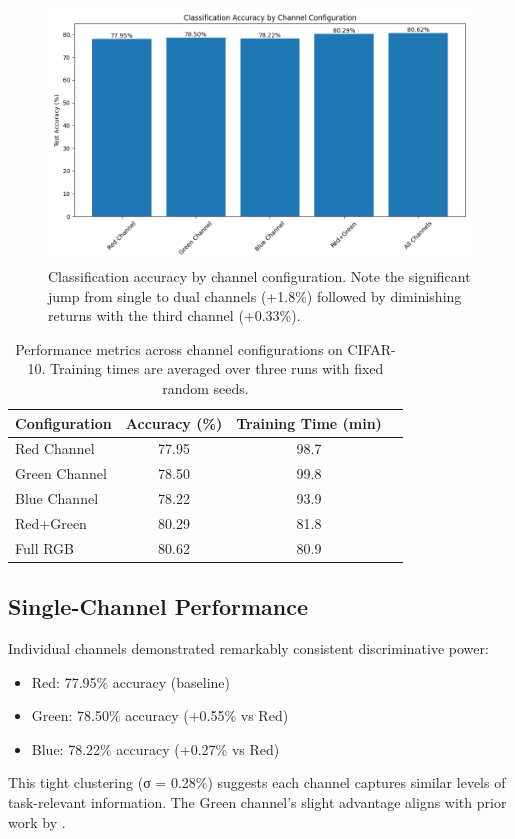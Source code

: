 \documentclass{article} %
\begin{document}
\begin{figure}[t]
    \centering
    \includegraphics[width=0.8\linewidth]{accuracy_comparison.png}
    \caption{Classification accuracy by channel configuration. Note the significant jump from single to dual channels (+1.8\%) followed by diminishing returns with the third channel (+0.33\%).}
    \label{fig:accuracy}
\end{figure}

\begin{table}[h]
    \centering
    \begin{tabular}{lccc}
        \toprule
        Configuration & Accuracy (\%) & Training Time (min) \\
        \midrule
        Red Channel & 77.95 & 98.7 \\
        Green Channel & 78.50 & 99.8 \\
        Blue Channel & 78.22 & 93.9 \\
        Red+Green & 80.29 & 81.8 \\
        Full RGB & 80.62 & 80.9 \\
        \bottomrule
    \end{tabular}
    \caption{Performance metrics across channel configurations on CIFAR-10. Training times are averaged over three runs with fixed random seeds.}
    \label{tab:results}
\end{table}

\subsection{Single-Channel Performance}
Individual channels demonstrated remarkably consistent discriminative power:
\begin{itemize}
    \item Red: 77.95\% accuracy (baseline)
    \item Green: 78.50\% accuracy (+0.55\% vs Red)
    \item Blue: 78.22\% accuracy (+0.27\% vs Red)
\end{itemize}
This tight clustering (σ = 0.28\%) suggests each channel captures similar levels of task-relevant information. The Green channel's slight advantage aligns with prior work by \citet{wang2018mask}.
\end{document}
